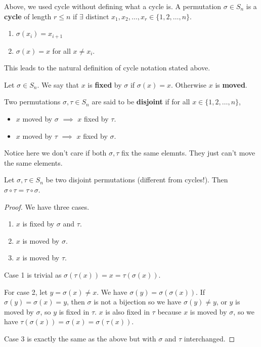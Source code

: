 \begin{df}
Above, we used cycle without defining what a cycle is. A permutation
$\sigma \in S_n$ is a \textbf{cycle} of length $r \leq n$ if $\exists$
distinct $x_1, x_2, \dots, x_r \in \lbrace 1, 2, \dots, n \rbrace$.
\begin{enumerate}
\item $\sigma(x_i) = x_{i + 1}$
\item $\sigma(x) = x$ for all $x \neq x_i$.
\end{enumerate}
This leads to the natural definition of cycle notation stated above.
\end{df}

\begin{df}
Let $\sigma \in S_n$. We say that $x$ is \textbf{fixed} by $\sigma$ if
$\sigma(x) = x$. Otherwise $x$ is \textbf{moved}.
\end{df}

\begin{df}
Two permutations $\sigma, \tau \in S_n$ are said to be \textbf{disjoint}
if for all $x \in \lbrace 1, 2, \dots, n \rbrace$,
\begin{itemize}
\item $x$ moved by $\sigma$ $\implies$ $x$ fixed by $\tau$.
\item $x$ moved by $\tau$ $\implies$ $x$ fixed by $\sigma$.
\end{itemize}
Notice here we don't care if both $\sigma, \tau$ fix the same elemnts.
They just can't move the same elements.
\end{df}

\begin{lem}
Let $\sigma, \tau \in S_n$ be two disjoint permutations (different from
cycles!). Then $\sigma \circ \tau = \tau \circ \sigma$.
\end{lem}

\begin{proof}
We have three cases.
\begin{enumerate}
\item $x$ is fixed by $\sigma$ and $\tau$.
\item $x$ is moved by $\sigma$.
\item $x$ is moved by $\tau$.
\end{enumerate}
Case 1 is trivial as $\sigma(\tau(x)) = x = \tau(\sigma(x))$.

For case 2, let $y = \sigma(x) \neq x$. We have $\sigma(y) =
\sigma(\sigma(x))$. If $\sigma(y) = \sigma(x) = y$, then $\sigma$ is not
a bijection so we have $\sigma(y) \neq y$, or $y$ is moved by $\sigma$,
so $y$ is fixed in $\tau$. $x$ is also fixed in $\tau$ because $x$ is
moved by $\sigma$, so we have $\tau(\sigma(x)) = \sigma(x) =
\sigma(\tau(x))$.

Case 3 is exactly the same as the above but with $\sigma$ and $\tau$
interchanged.
\end{proof}

